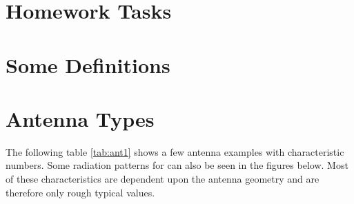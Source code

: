 \documentclass[10pt, a4paper]{article}
\begin{document}


\section*{Homework Tasks}

\pagebreak

\section{Some Definitions}


\pagebreak
\section{Antenna Types}

The following table \ref{tab:ant1} shows a few antenna examples with characteristic numbers.
Some radiation patterns for can also be seen in the figures below. Most of these characteristics are dependent upon the antenna geometry and are therefore only rough typical values.\\



\end{document}
